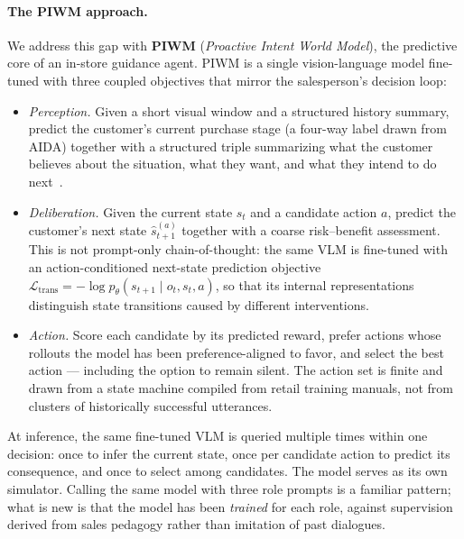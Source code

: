 \documentclass{article}
\begin{document}
\paragraph{The PIWM approach.}
We address this gap with \textbf{PIWM} (\emph{Proactive Intent World Model}), the predictive core of an in-store guidance agent. PIWM is a single vision-language model fine-tuned with three coupled objectives that mirror the salesperson's decision loop:
\begin{itemize}
  \item \emph{Perception.} Given a short visual window and a structured history summary, predict the customer's current purchase stage (a four-way label drawn from AIDA) together with a structured triple summarizing what the customer believes about the situation, what they want, and what they intend to do next~\cite{Bratman}.
  \item \emph{Deliberation.} Given the current state $s_t$ and a candidate action $a$, predict the customer's next state $\hat{s}_{t+1}^{(a)}$ together with a coarse risk--benefit assessment. This is not prompt-only chain-of-thought: the same VLM is fine-tuned with an action-conditioned next-state prediction objective $\mathcal{L}_{\text{trans}} = -\log p_\theta(s_{t+1} \mid o_t, s_t, a)$, so that its internal representations distinguish state transitions caused by different interventions.
  \item \emph{Action.} Score each candidate by its predicted reward, prefer actions whose rollouts the model has been preference-aligned to favor, and select the best action --- including the option to remain silent. The action set is finite and drawn from a state machine compiled from retail training manuals, not from clusters of historically successful utterances.
\end{itemize}
At inference, the same fine-tuned VLM is queried multiple times within one decision: once to infer the current state, once per candidate action to predict its consequence, and once to select among candidates. The model serves as its own simulator. Calling the same model with three role prompts is a familiar pattern; what is new is that the model has been \emph{trained} for each role, against supervision derived from sales pedagogy rather than imitation of past dialogues.
\end{document}
